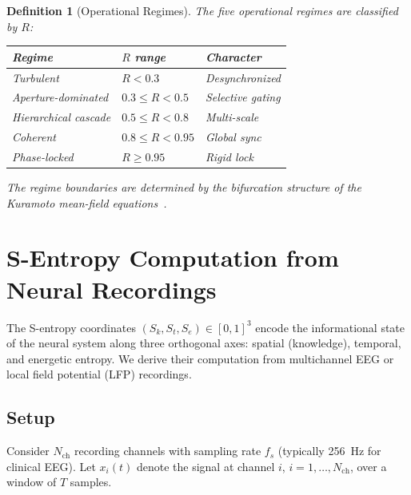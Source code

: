 \documentclass[11pt,twocolumn,a4paper]{article}
\newtheorem{definition}[theorem]{Definition}
\newcommand{\Sk}{S_k}
\newcommand{\St}{S_t}
\newcommand{\Se}{S_e}
\begin{document}
\begin{definition}[Operational Regimes]
\label{def:regimes}
The five operational regimes are classified by $R$:
\begin{center}
\begin{tabular}{lll}
\toprule
Regime & $R$ range & Character \\
\midrule
Turbulent & $R < 0.3$ & Desynchronized \\
Aperture-dominated & $0.3 \leq R < 0.5$ & Selective gating \\
Hierarchical cascade & $0.5 \leq R < 0.8$ & Multi-scale \\
Coherent & $0.8 \leq R < 0.95$ & Global sync \\
Phase-locked & $R \geq 0.95$ & Rigid lock \\
\bottomrule
\end{tabular}
\end{center}
The regime boundaries are determined by the bifurcation structure of the Kuramoto mean-field equations~\cite{kuramoto1975,acebron2005}.
\end{definition}



\section{S-Entropy Computation from Neural Recordings}
\label{sec:sentropy}

The S-entropy coordinates $(\Sk, \St, \Se) \in [0,1]^3$ encode the informational state of the neural system along three orthogonal axes: spatial (knowledge), temporal, and energetic entropy.
We derive their computation from multichannel EEG or local field potential (LFP) recordings.

\subsection{Setup}

Consider $N_{\mathrm{ch}}$ recording channels with sampling rate $f_s$ (typically 256~Hz for clinical EEG).
Let $x_i(t)$ denote the signal at channel $i$, $i = 1, \ldots, N_{\mathrm{ch}}$, over a window of $T$ samples.
\end{document}
